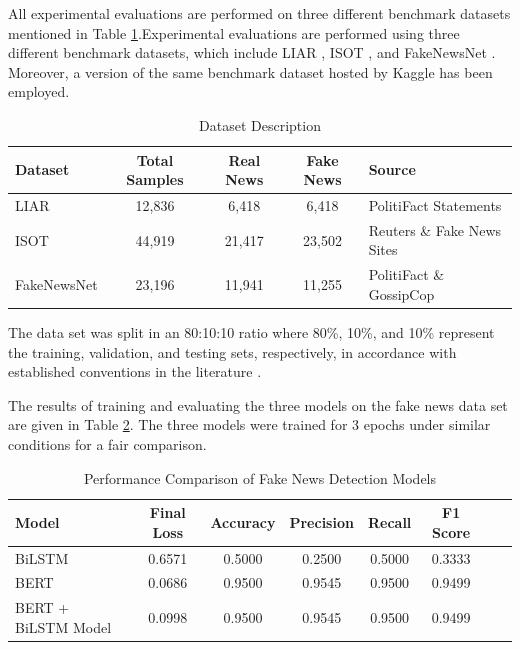 \documentclass[runningheads]{llncs}
\begin{document}
All experimental evaluations are performed on three different benchmark datasets mentioned in Table \ref{tab:datasets}.Experimental evaluations are performed using three different benchmark datasets, which include LIAR \cite{Wang2017Liar}, ISOT \cite{ISOTDataset}, and FakeNewsNet \cite{Shu2020FakeNewsNet}. Moreover, a version of the same benchmark dataset hosted by Kaggle has been employed.

\begin{table}[h]
\centering
\caption{Dataset Description}
\label{tab:datasets}
\begin{tabular}{|l|c|c|c|l|}
\hline
\textbf{Dataset} & \textbf{Total Samples} & \textbf{Real News} & \textbf{Fake News} & \textbf{Source} \\ \hline
LIAR & 12,836 & 6,418 & 6,418 & PolitiFact Statements \\
ISOT & 44,919 & 21,417 & 23,502 & Reuters \& Fake News Sites \\
FakeNewsNet & 23,196 & 11,941 & 11,255 & PolitiFact \& GossipCop \\ \hline
\end{tabular}
\end{table}

The data set was split in an 80:10:10 ratio where 80\%, 10\%, and 10\% represent the training, validation, and testing sets, respectively, in accordance with established conventions in the literature \cite{Kaliyar2021FakeBERT,Rai2022FakeNews}.


The results of training and evaluating the three models on the fake news data set are given in Table \ref{tab:comparison}. The three models were trained for 3 epochs under similar conditions for a fair comparison.

\begin{table}[h]
\centering
\caption{Performance Comparison of Fake News Detection Models}
\label{tab:comparison}
\small
\begin{tabular}{p{}ccccccp{}}
\hline
 \textbf{Model} & \textbf{Final Loss} & \textbf{Accuracy} & \textbf{Precision} & \textbf{Recall} & \textbf{F1 Score} \\ \hline
 BiLSTM & 0.6571 & 0.5000 & 0.2500 & 0.5000 & 0.3333 \\ 
 BERT & 0.0686 & 0.9500 & 0.9545 & 0.9500 & 0.9499  \\ 
 BERT + BiLSTM Model & 0.0998 & 0.9500 & 0.9545 & 0.9500 & 0.9499 \\ \hline
\end{tabular}
\end{table}
\end{document}
